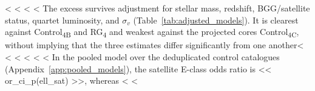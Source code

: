 \documentclass{aa}
\newcommand{\CB}{Control\textsubscript{4B}}
\newcommand{\CC}{Control\textsubscript{4C}}
\newcommand{\RG}{RG\textsubscript{4}}
\begin{document}
<%
<%
<%
<%
The excess survives adjustment for stellar mass, redshift, BGG/satellite status, quartet luminosity, and \(\sigma_v\) (Table~\ref{tab:adjusted_models}). It is clearest against \CB{} and \RG{} and weakest against the projected cores \CC{}, without implying that the three estimates differ significantly from one another<%
<%
<%
<%
<%
<%
In the pooled model over the deduplicated control catalogues (Appendix~\ref{app:pooled_models}), the satellite E-class odds ratio is << or_ci_p(ell_sat) >>, whereas <%
<%
\end{document}
